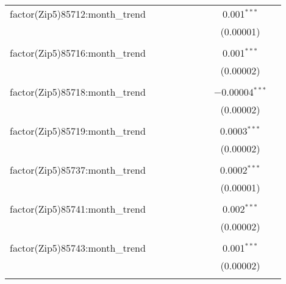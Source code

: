 \begin{table}[H]
{\begin{tabular}{@{\extracolsep{5pt}}lcccccccc}
  factor(Zip5)85712:month\_trend &  &  &  &  &  &  & 0.001$^{***}$ &  \\  

   &  &  &  &  &  &  & (0.00001) &  \\  

   & & & & & & & & \\  

  factor(Zip5)85716:month\_trend &  &  &  &  &  &  & 0.001$^{***}$ &  \\  

   &  &  &  &  &  &  & (0.00002) &  \\  

   & & & & & & & & \\  

  factor(Zip5)85718:month\_trend &  &  &  &  &  &  & $-$0.00004$^{***}$ &  \\  

   &  &  &  &  &  &  & (0.00002) &  \\  

   & & & & & & & & \\  

  factor(Zip5)85719:month\_trend &  &  &  &  &  &  & 0.0003$^{***}$ &  \\  

   &  &  &  &  &  &  & (0.00002) &  \\  

   & & & & & & & & \\  

  factor(Zip5)85737:month\_trend &  &  &  &  &  &  & 0.0002$^{***}$ &  \\  

   &  &  &  &  &  &  & (0.00001) &  \\  

   & & & & & & & & \\  

  factor(Zip5)85741:month\_trend &  &  &  &  &  &  & 0.002$^{***}$ &  \\  

   &  &  &  &  &  &  & (0.00002) &  \\  

   & & & & & & & & \\  

  factor(Zip5)85743:month\_trend &  &  &  &  &  &  & 0.001$^{***}$ &  \\  

   &  &  &  &  &  &  & (0.00002) &  \\  

   & & & & & & & & \\  


\end{tabular}}
\end{table}
